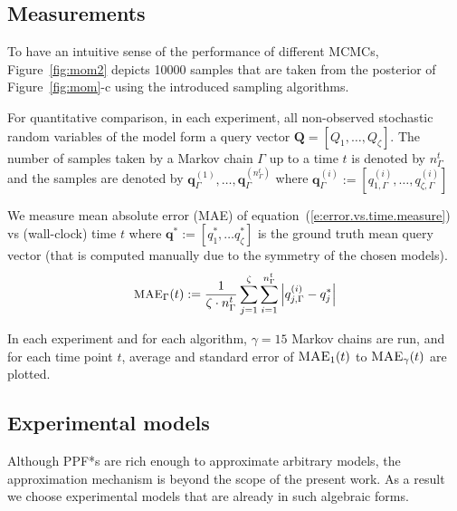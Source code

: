 \documentclass[letterpaper]{article}
\newcommand{\bvec}[1]{\textbf{#1}}
\begin{document}
\subsection{Measurements}
To have an intuitive sense of the performance of different MCMCs,
Figure~\ref{fig:mom2} depicts 10000 samples that are taken from the posterior of 
Figure~\ref{fig:mom}-c using the introduced sampling algorithms. 

For quantitative comparison,  
in each experiment, all non-observed stochastic random variables of the model  form a query vector $\bvec{Q} = [Q_1, \ldots, Q_\zeta]$.
The number of samples taken by a Markov chain $\Gamma$ up to a time $t$ is denoted by $n_{\Gamma}^t$ and  
the samples are denoted by 
$\bvec{q}_\Gamma^{(1)}, \ldots, \bvec{q}^{(n_{\Gamma}^t)}_\Gamma$
where $\bvec{q}_\Gamma^{(i)} := 
[q_{1, \Gamma}^{(i)} , \ldots, q_{\zeta, \Gamma}^{(i)}]$

We measure mean absolute error (MAE) of equation~(\ref{e:error.vs.time.measure}) vs (wall-clock) time $t$ where 
$\bvec{q}^* := [q_1^*, \ldots q_\zeta^*]$ 
is the ground truth mean query vector (that is computed manually due to the symmetry of the chosen models).
\begin{equation}\footnotesize
\label{e:error.vs.time.measure}
\textsc{MAE}_{\Gamma}(t) := \frac{1}{\zeta \cdot n_\Gamma^t} 
\sum_{j=1}^{\zeta}
\sum_{i=1}^{n_\Gamma^t}
\left|{q}^{(i)}_{j, \Gamma} - {q}_j^* \right|
\end{equation}


In each experiment and for each algorithm, $\gamma = 15$ Markov chains are run,  and for each time point $t$,
average and standard error of %
$\textsc{MAE}_{1}(t)$ to $\textsc{MAE}_{\gamma}(t)$
are plotted. 

\subsection{Experimental models}
\label{sect:experimental.results.models}
Although PPF*s are rich enough to approximate arbitrary models, the approximation mechanism is beyond the scope of the present work.
As a result we choose experimental models that are already in such algebraic forms.
\end{document}
